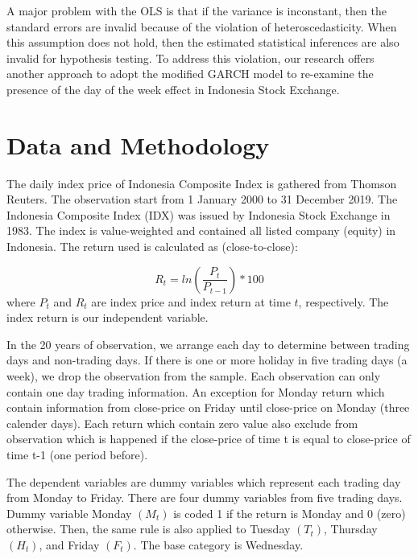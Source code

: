 \documentclass[12pt]{article}
\begin{document}
A major problem with the OLS is that if the variance is inconstant, then the standard errors are invalid because of the violation of heteroscedasticity. When this assumption does not hold, then the estimated statistical inferences are also invalid for hypothesis testing. To address this violation, our research offers another approach to adopt the modified GARCH model to re-examine the presence of the day of the week effect in Indonesia Stock Exchange.

\section*{Data and Methodology}
\label{sec:data}

The daily index price of Indonesia Composite Index is gathered  from Thomson Reuters. The observation start from 1 January 2000 to 31 December 2019. The Indonesia Composite Index (IDX) was issued by Indonesia Stock Exchange in 1983. The index is value-weighted and contained all listed company (equity)  in Indonesia. The return used is calculated as  (close-to-close):

\begin{equation} \label{eq:return}
R_t =  ln \left (\frac{P_{t}}{P_{t-1}} \right)   *100
\end{equation}
where $P_t$ and $R_t$ are index price and index return at time $t$, respectively. The index return is our independent variable.

In the 20 years of observation, we arrange each day to determine between trading days and non-trading days. If there is one or more holiday in five trading days (a week), we drop the observation from the sample. Each observation can only contain one day trading information.  An exception for Monday return which contain information from close-price on Friday until close-price on Monday (three calender days). Each return which contain zero value also exclude from observation which is happened if the close-price of time t is equal to close-price of time t-1 (one period before).

The dependent variables are dummy variables which represent each trading day from Monday to Friday. There are four dummy variables from five trading days. Dummy variable Monday $ (M_t)$ is coded 1  if the return is Monday and 0 (zero) otherwise. Then, the same rule is also applied to Tuesday $ (T_t)$, Thursday $(H_t)$, and Friday $(F_t)$. The base category is Wednesday.
\end{document}
